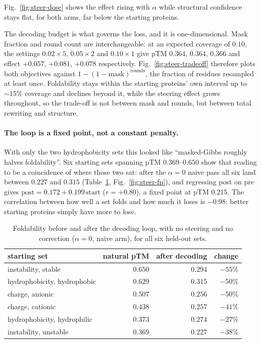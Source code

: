 \documentclass{article}
\begin{document}
Fig.~\ref{fig:steer-dose} shows the effect rising with $\alpha$ while structural confidence
stays flat, for both arms, far below the starting proteins.

The decoding budget is what governs the loss, and it is one-dimensional. Mask fraction and
round count are interchangeable: at an expected coverage of $0.10$, the settings
$0.02{\times}5$, $0.05{\times}2$ and $0.10{\times}1$ give pTM $0.364$, $0.364$, $0.366$ and
effect $+0.057$, $+0.081$, $+0.078$ respectively. Fig.~\ref{fig:steer-tradeoff} therefore
plots both objectives against $1-(1-\mathrm{mask})^{\mathrm{rounds}}$, the fraction of
residues resampled at least once. Foldability stays within the starting proteins' own
interval up to ${\sim}15\%$ coverage and declines beyond it, while the steering effect grows
throughout, so the trade-off is not between mask and rounds, but between total rewriting
and structure.

\paragraph{The loop is a fixed point, not a constant penalty.} With only the two
hydrophobicity sets this looked like ``masked-Gibbs roughly halves foldability''. Six
starting sets spanning pTM $0.369$--$0.650$ show that reading to be a coincidence of where
those two sat: after the $\alpha{=}0$ naive pass all six land between $0.227$ and $0.315$
(Table~\ref{tab:steer-decode6}, Fig.~\ref{fig:steer-fp}), and regressing post on pre gives
$\mathrm{post} = 0.172 + 0.199\,\mathrm{start}$ ($r{=}{+}0.80$), a fixed point at pTM
$0.215$. The correlation between how well a set folds and how much it loses is $-0.98$:
better starting proteins simply have more to lose.

\begin{table}[htbp]
\centering
\caption{Foldability before and after the decoding loop, with no steering and no correction
($\alpha{=}0$, naive arm), for all six held-out sets.}
\label{tab:steer-decode6}
\begin{tabular}{lrrr}
\toprule
starting set & natural pTM & after decoding & change \\
\midrule
instability, stable         & $0.650$ & $0.294$ & $-55\%$ \\
hydrophobicity, hydrophobic & $0.629$ & $0.315$ & $-50\%$ \\
charge, anionic             & $0.507$ & $0.256$ & $-50\%$ \\
charge, cationic            & $0.438$ & $0.257$ & $-41\%$ \\
hydrophobicity, hydrophilic & $0.373$ & $0.274$ & $-27\%$ \\
instability, unstable       & $0.369$ & $0.227$ & $-38\%$ \\
\bottomrule
\end{tabular}
\end{table}
\end{document}
